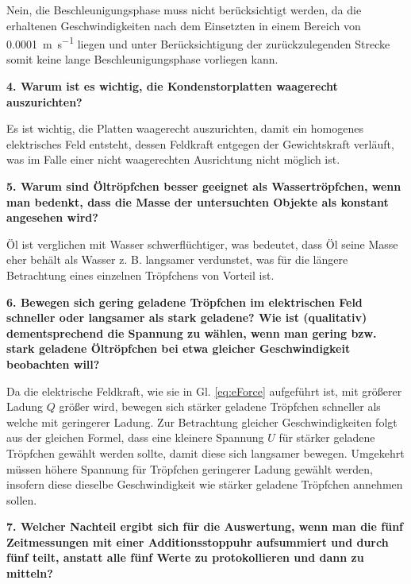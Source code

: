 Nein, die Beschleunigungsphase muss nicht berücksichtigt werden, da die erhaltenen Geschwindigkeiten nach dem Einsetzten in einem Bereich von \SI{0,0001}{\meter\per\second} liegen und unter Berücksichtigung der zurückzulegenden Strecke somit keine lange Beschleunigungsphase vorliegen kann.

\vspace{0,5cm}
\noindent \textbf{4. Warum ist es wichtig, die Kondenstorplatten waagerecht auszurichten?}

Es ist wichtig, die Platten waagerecht auszurichten, damit ein homogenes elektrisches Feld entsteht, dessen Feldkraft entgegen der Gewichtskraft verläuft, was im Falle einer nicht waagerechten Ausrichtung nicht möglich ist.

\vspace{0,5cm}
\noindent \textbf{5. Warum sind Öltröpfchen besser geeignet als Wassertröpfchen, wenn man bedenkt, dass die Masse der untersuchten Objekte als konstant angesehen wird?}

Öl ist verglichen mit Wasser schwerflüchtiger, was bedeutet, dass Öl seine Masse eher behält als Wasser z. B. langsamer verdunstet, was für die längere Betrachtung eines einzelnen Tröpfchens von Vorteil ist.

\vspace{0,5cm}
\noindent \textbf{6. Bewegen sich gering geladene Tröpfchen im elektrischen Feld schneller oder langsamer als stark geladene? Wie ist (qualitativ) dementsprechend die Spannung zu wählen, wenn man gering bzw. stark geladene Öltröpfchen bei etwa gleicher Geschwindigkeit beobachten will?}

Da die elektrische Feldkraft, wie sie in Gl. \ref{eq:eForce} aufgeführt ist, mit größerer Ladung $Q$ größer wird, bewegen sich stärker geladene Tröpfchen schneller als welche mit geringerer Ladung. Zur Betrachtung gleicher Geschwindigkeiten folgt aus der gleichen Formel, dass eine kleinere Spannung $U$ für stärker geladene Tröpfchen gewählt werden sollte, damit diese sich langsamer bewegen. Umgekehrt müssen höhere Spannung für Tröpfchen geringerer Ladung gewählt werden, insofern diese dieselbe Geschwindigkeit wie stärker geladene Tröpfchen annehmen sollen.

\vspace{0,5cm}
\noindent \textbf{7. Welcher Nachteil ergibt sich für die Auswertung, wenn man die fünf Zeitmessungen mit einer Additionsstoppuhr aufsummiert und durch fünf teilt, anstatt alle fünf Werte zu protokollieren und dann zu mitteln?}

